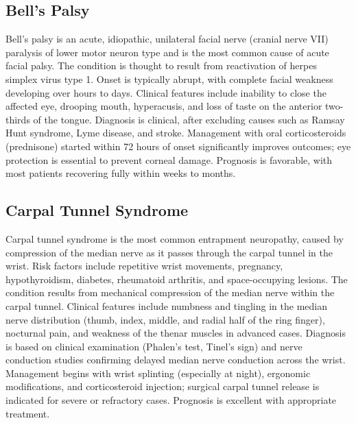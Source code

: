 \subsection{Bell's Palsy}
\label{sec:Bell's Palsy}
Bell's palsy is an acute, idiopathic, unilateral facial nerve (cranial nerve VII) paralysis of lower motor neuron type and is the most common cause of acute facial palsy. The condition is thought to result from reactivation of herpes simplex virus type 1. Onset is typically abrupt, with complete facial weakness developing over hours to days. Clinical features include inability to close the affected eye, drooping mouth, hyperacusis, and loss of taste on the anterior two-thirds of the tongue. Diagnosis is clinical, after excluding causes such as Ramsay Hunt syndrome, Lyme disease, and stroke. Management with oral corticosteroids (prednisone) started within 72 hours of onset significantly improves outcomes; eye protection is essential to prevent corneal damage. Prognosis is favorable, with most patients recovering fully within weeks to months.

\subsection{Carpal Tunnel Syndrome}
\label{sec:Carpal Tunnel Syndrome}
Carpal tunnel syndrome is the most common entrapment neuropathy, caused by compression of the median nerve as it passes through the carpal tunnel in the wrist. Risk factors include repetitive wrist movements, pregnancy, hypothyroidism, diabetes, rheumatoid arthritis, and space-occupying lesions. The condition results from mechanical compression of the median nerve within the carpal tunnel. Clinical features include numbness and tingling in the median nerve distribution (thumb, index, middle, and radial half of the ring finger), nocturnal pain, and weakness of the thenar muscles in advanced cases. Diagnosis is based on clinical examination (Phalen's test, Tinel's sign) and nerve conduction studies confirming delayed median nerve conduction across the wrist. Management begins with wrist splinting (especially at night), ergonomic modifications, and corticosteroid injection; surgical carpal tunnel release is indicated for severe or refractory cases. Prognosis is excellent with appropriate treatment.

